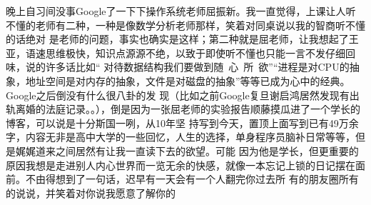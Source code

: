 晚上自习间没事Google了一下下操作系统老师屈振新。我一直觉得，上课让人听不懂的老师有二种，一种是像数学分析老师那样，笑着对同桌说以我的智商听不懂的话绝对
是老师的问题，事实也确实是这样；第二种就是屈老师，让我想起了王亚，语速思维极快，知识点源源不绝，以致于即使听不懂也只能一言不发仔细回味，说的许多话比如“
对待数据结构我们要做到随~心~所~欲”“进程是对CPU的抽象，地址空间是对内存的抽象，文件是对磁盘的抽象”等等已成为心中的经典。Google之后倒没有什么很八卦的发
现（比如之前Google复旦谢启鸿居然发现有出轨离婚的法庭记录。。），倒是因为一张屈老师的实验报告顺藤摸瓜进了一个学长的博客，可以说是十分斯国一咧，从10年坚
持写到今天，置顶上面写到已有49万余字，内容无非是高中大学的一些回忆，人生的选择，单身程序员脑补日常等等，但是娓娓道来之间居然有让我一直读下去的欲望。可能
因为他是学长，但更重要的原因我想是走进别人内心世界而一览无余的快感，就像一本忘记上锁的日记摆在面前。不由得想到了一句话，迟早有一天会有一个人翻完你过去所
有的朋友圈所有的说说，并笑着对你说我愿意了解你的
